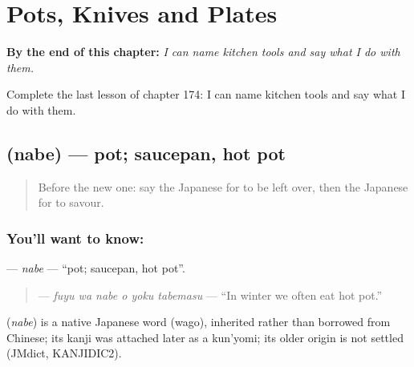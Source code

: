 
\chapter{Pots, Knives and Plates}
\label{ch:ja-pots-knives-and-plates}

\begin{chapteropening}
\textbf{By the end of this chapter:} \emph{I can name kitchen tools and say what I do with them.}

Complete the last lesson of chapter 174: I can name kitchen tools and say what I do with them.
\end{chapteropening}

\section[\texorpdfstring{\ja{なべ} (nabe)}{なべ (nabe)}]{ (nabe) — pot; saucepan, hot pot}

\label{lesson:JA-C174-nabe}



\begin{quote}
Before the new one: say the Japanese for to be left over, then the Japanese for to savour.
\end{quote}

\subsection*{You'll want to know: }
\textbf{} — \emph{nabe} — \textquotedblleft{}pot; saucepan, hot pot\textquotedblright{}.

\begin{quote}
\textbf{   } — \emph{fuyu wa nabe o yoku tabemasu} — \textquotedblleft{}In winter we often eat hot pot.\textquotedblright{}
\end{quote}

\begin{cousinweb}
\textbf{} (\emph{nabe}) is a native Japanese word (wago), inherited rather than borrowed from Chinese; its kanji was attached later as a kun'yomi; its older origin is not settled (JMdict, KANJIDIC2).
\end{cousinweb}

